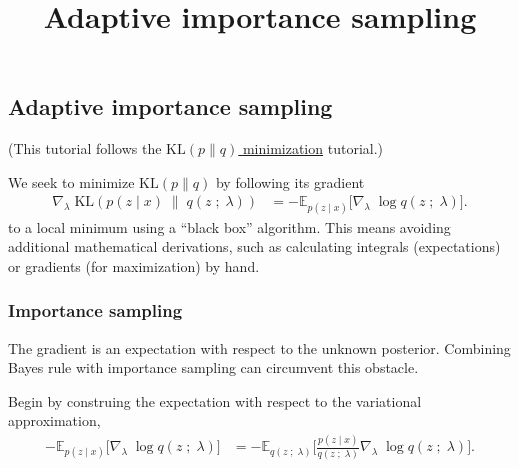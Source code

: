 \title{Adaptive importance sampling}

\subsection{Adaptive importance sampling}

(This tutorial follows the
\href{tut_KLpq.html}{$\text{KL}(p\|q)$ minimization} tutorial.)

We seek to minimize $\text{KL}(p\|q)$ by following its gradient
\begin{align*}
  \nabla_\lambda\;
  \text{KL}( 
  p(z \mid x)
  \;\|\;
  q(z\;;\;\lambda)
  )
  &=
  -
  \mathbb{E}_{p(z \mid x)}
  \big[
  \nabla_\lambda\;
  \log q(z\;;\;\lambda)
  \big].
\end{align*}
to a local minimum using a ``black box'' algorithm. This means avoiding
additional mathematical derivations, such as calculating integrals 
(expectations) or gradients (for maximization) by hand.

\subsubsection{Importance sampling}

The gradient is an expectation with respect to the unknown posterior. Combining
Bayes rule with importance sampling can circumvent this obstacle. 

Begin by construing the expectation with respect to the variational
approximation,
\begin{align*}
  -
  \mathbb{E}_{p(z \mid x)}
  \big[
  \nabla_\lambda\;
  \log q(z\;;\;\lambda)
  \big]
  &=
  -
  \mathbb{E}_{q(z\;;\;\lambda)}
  \Bigg[
  \frac{p(z \mid x)}{q(z\;;\;\lambda)}
  \nabla_\lambda\;
  \log q(z\;;\;\lambda)
  \Bigg].
\end{align*}

